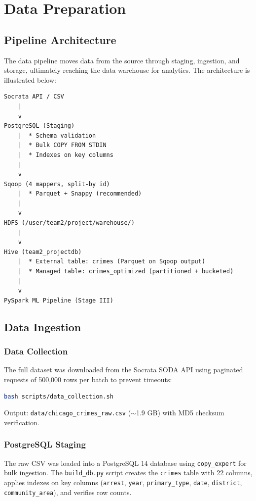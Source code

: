 \section{Data Preparation}
\label{sec:data-prep}

\subsection{Pipeline Architecture}

The data pipeline moves data from the source through staging, ingestion, and storage, ultimately reaching the data warehouse for analytics. The architecture is illustrated below:

\begin{verbatim}
Socrata API / CSV
    |
    v
PostgreSQL (Staging)
    |  * Schema validation
    |  * Bulk COPY FROM STDIN
    |  * Indexes on key columns
    |
    v
Sqoop (4 mappers, split-by id)
    |  * Parquet + Snappy (recommended)
    |
    v
HDFS (/user/team2/project/warehouse/)
    |
    v
Hive (team2_projectdb)
    |  * External table: crimes (Parquet on Sqoop output)
    |  * Managed table: crimes_optimized (partitioned + bucketed)
    |
    v
PySpark ML Pipeline (Stage III)
\end{verbatim}

\subsection{Data Ingestion}

\subsubsection{Data Collection}

The full dataset was downloaded from the Socrata SODA API using paginated requests of 500,000 rows per batch to prevent timeouts:

\begin{lstlisting}[language=bash, caption={Data collection script}]
bash scripts/data_collection.sh
\end{lstlisting}

Output: \texttt{data/chicago\_crimes\_raw.csv} ($\sim$1.9 GB) with MD5 checksum verification.

\subsubsection{PostgreSQL Staging}

The raw CSV was loaded into a PostgreSQL 14 database using \texttt{copy\_expert} for bulk ingestion. The \texttt{build\_db.py} script creates the \texttt{crimes} table with 22 columns, applies indexes on key columns (\texttt{arrest}, \texttt{year}, \texttt{primary\_type}, \texttt{date}, \texttt{district}, \texttt{community\_area}), and verifies row counts.

